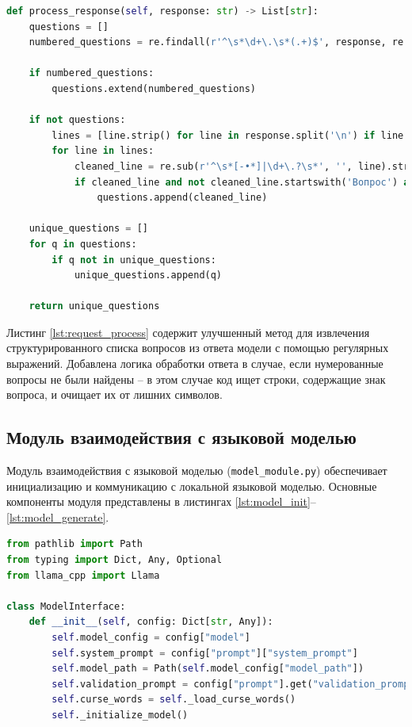\begin{lstlisting}[caption={Создание промпта и обработка ответа модели}, label=lst:request_process, language=Python]
def process_response(self, response: str) -> List[str]:
	questions = []
	numbered_questions = re.findall(r'^\s*\d+\.\s*(.+)$', response, re.MULTILINE)

	if numbered_questions:
		questions.extend(numbered_questions)

	if not questions:
		lines = [line.strip() for line in response.split('\n') if line.strip()]
		for line in lines:
			cleaned_line = re.sub(r'^\s*[-•*]|\d+\.?\s*', '', line).strip()
			if cleaned_line and not cleaned_line.startswith('Вопрос') and '?' in cleaned_line:
				questions.append(cleaned_line)

	unique_questions = []
	for q in questions:
		if q not in unique_questions:
			unique_questions.append(q)

	return unique_questions
\end{lstlisting}

Листинг \ref{lst:request_process} содержит улучшенный метод для извлечения структурированного списка вопросов из ответа модели с помощью регулярных выражений. Добавлена логика обработки ответа в случае, если нумерованные вопросы не были найдены -- в этом случае код ищет строки, содержащие знак вопроса, и очищает их от лишних символов.

\subsection{Модуль взаимодействия с языковой моделью}

Модуль взаимодействия с языковой моделью (\texttt{model\_module.py}) обеспечивает инициализацию и коммуникацию с локальной языковой моделью. Основные компоненты модуля представлены в листингах \ref{lst:model_init}--\ref{lst:model_generate}.

\newpage

\begin{lstlisting}[caption={Инициализация интерфейса модели}, label=lst:model_init, language=Python]
from pathlib import Path
from typing import Dict, Any, Optional
from llama_cpp import Llama

class ModelInterface:
	def __init__(self, config: Dict[str, Any]):
		self.model_config = config["model"]
		self.system_prompt = config["prompt"]["system_prompt"]
		self.model_path = Path(self.model_config["model_path"])
		self.validation_prompt = config["prompt"].get("validation_prompt", "Проверь, соответствует ли следующий ответ правовым нормам и законам РФ, а также моральным и этическим стандартам. Не нарушает ли материал какие-либо законы? Если ответ соответствует нормам, ответь 'ВАЛИДНО'. Если нет - ответь 'НАРУШЕНИЕ'. Ответ: {response}")
		self.curse_words = self._load_curse_words()
		self._initialize_model()
\end{lstlisting}

